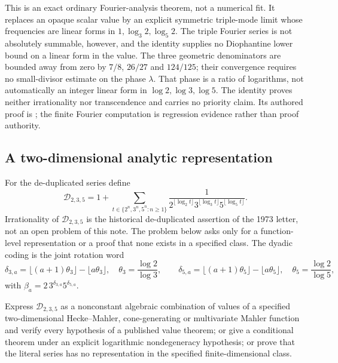 This is an exact ordinary Fourier-analysis theorem, not a numerical fit.
It replaces an opaque scalar value by an explicit symmetric triple-mode
limit whose frequencies are linear forms in $1,\log_3 2,\log_5 2$.
The triple Fourier series is not absolutely summable, however, and the
identity supplies no Diophantine lower bound on a linear form in the value.
The three geometric denominators are bounded away from zero by $7/8$,
$26/27$ and $124/125$; their convergence requires no small-divisor estimate
on the phase $\lambda$.  That phase is a ratio of logarithms, not
automatically an integer linear form in $\log 2,\log 3,\log 5$.  The identity
proves neither irrationality nor transcendence and carries no priority claim.
Its authored proof is
; the finite
Fourier computation is regression evidence rather than proof authority.

\subsection{A two-dimensional analytic representation}

For the de-duplicated series define
\[
 \mathcal D_{2,3,5}=1+
 \sum_{t\in\{2^n,3^n,5^n:n\ge1\}}
 \frac{1}{
   2^{\lfloor\log_2t\rfloor}
   3^{\lfloor\log_3t\rfloor}
   5^{\lfloor\log_5t\rfloor}}.
\]
Irrationality of $\mathcal D_{2,3,5}$ is the historical de-duplicated
assertion of the 1973 letter, not an open problem of this note.  The problem
below asks only for a function-level representation or a proof that none
exists in a specified class.
The dyadic coding is the joint rotation word
\[
 \delta_{3,a}=\lfloor(a+1)\theta_3\rfloor-\lfloor a\theta_3\rfloor,
 \quad \theta_3=\frac{\log2}{\log3},\qquad
 \delta_{5,a}=\lfloor(a+1)\theta_5\rfloor-\lfloor a\theta_5\rfloor,
 \quad \theta_5=\frac{\log2}{\log5},
\]
with $\beta_a=2\,3^{\delta_{3,a}}5^{\delta_{5,a}}$.

\begin{problem}
Express $\mathcal D_{2,3,5}$ as a nonconstant algebraic combination of values
of a specified two-dimensional Hecke--Mahler, cone-generating or multivariate
Mahler function and verify every hypothesis of a published value theorem; or
give a conditional theorem under an explicit logarithmic nondegeneracy
hypothesis; or prove that the literal series has no representation in the
specified finite-dimensional class.
\end{problem}

